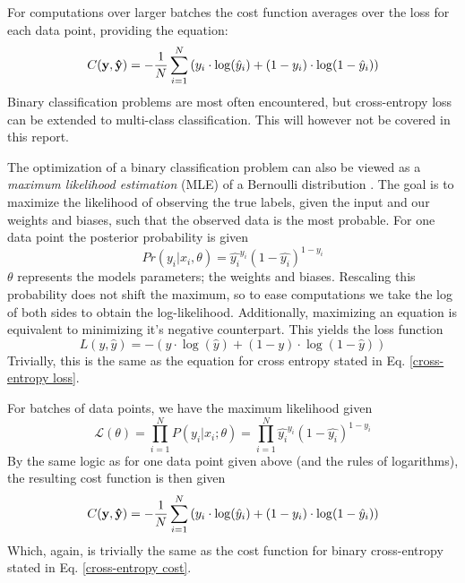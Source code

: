 For computations over larger batches the cost function averages over the loss for each data point, providing the equation:
\begin{equation}\label{cross-entropy cost}
    C(\bold{y}, \bold{\hat{y}}) = - \frac{1}{N} \sum_{i=1}^{N} \left( y_i \cdot \log(\hat{y}_i) + (1 - y_i) \cdot \log(1 - \hat{y}_i) \right)
\end{equation}
Binary classification problems are most often encountered, but cross-entropy loss can be extended to multi-class classification. This will however not be covered in this report. 

The optimization of a binary classification problem can also be viewed as a \textit{maximum likelihood estimation} (MLE) of a Bernoulli distribution \citep[p.129-133]{Goodfellow-et-al-2016}. The goal is to maximize the likelihood of observing the true labels, given the input and our weights and biases, such that the observed data is the most probable. For one data point the posterior probability is given
\begin{equation}
    Pr(y_i|x_i, \theta)= \hat{y_i}^{y_i}(1-\hat{y_i})^{1-y_i}
\end{equation}
$\theta$ represents the models parameters; the weights and biases. Rescaling this probability does not shift the maximum, so to ease computations we take the log of both sides to obtain the log-likelihood. Additionally, maximizing an equation is equivalent to minimizing it's negative counterpart. This yields the loss function
\begin{equation}
    L(y, \hat{y}) = - \left( y \cdot \log(\hat{y}) + (1 - y) \cdot \log(1 - \hat{y}) \right)
    \end{equation}
Trivially, this is the same as the equation for cross entropy stated in Eq. \ref{cross-entropy loss}.

For batches of data points, we have the maximum likelihood given 
\begin{equation}
    \mathcal{L}(\theta) = \prod_{i=1}^{N} P(y_i | x_i; \theta) = \prod_{i=1}^{N} \hat{y_i}^{y_i}(1-\hat{y_i})^{1-y_i}
\end{equation}
By the same logic as for one data point given above (and the rules of logarithms), the resulting cost function is then given
\begin{equation}
    C(\bold{y}, \bold{\hat{y}})= - \frac{1}{N} \sum_{i=1}^{N} \left( y_i \cdot \log(\hat{y}_i) + (1 - y_i) \cdot \log(1 - \hat{y}_i) \right)
\end{equation}
Which, again, is trivially the same as the cost function for binary cross-entropy stated in Eq. \ref{cross-entropy cost}. 
